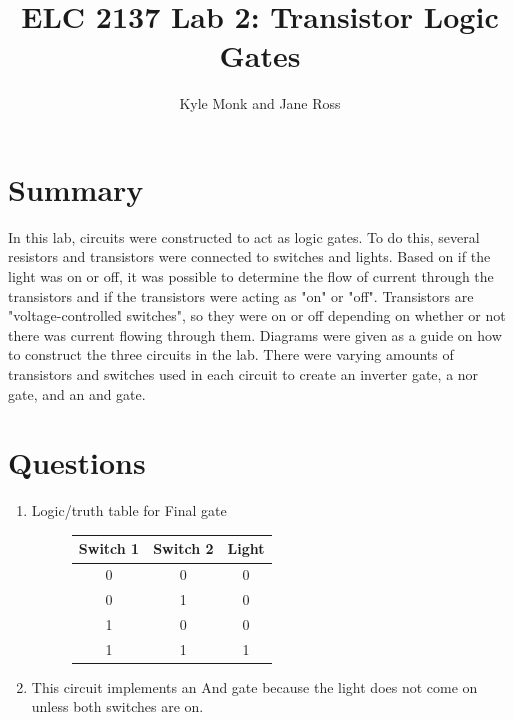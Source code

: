 \documentclass[11pt]{article}
\begin{document}
	
	\title{ELC 2137 Lab 2: Transistor Logic Gates}
	\author{Kyle Monk and Jane Ross}
	\maketitle
	
	
	\section*{Summary}
	
	In this lab, circuits were constructed to act as logic gates. To do this, several resistors and transistors were connected to switches and lights. Based on if the light was on or off, it was possible to determine the flow of current through the transistors and if the transistors were acting as "on" or "off". Transistors are "voltage-controlled switches", so they were on or off depending on whether or not there was current flowing through them. Diagrams were given as a guide on how to construct the three circuits in the lab. There were varying amounts of transistors and switches used in each circuit to create an inverter gate, a nor gate, and an and gate. 
	
	\section*{Questions}
	
	\begin{enumerate}
		\item Logic/truth table for Final gate
			\begin{figure}[ht]\centering
					\begin{tabular}{c|c|c}
						Switch 1 & Switch 2 & Light \\
						\midrule
						0 & 0 & 0 \\
						0 & 1 & 0 \\
						1 & 0 & 0 \\
						1 & 1 & 1 \\
						\bottomrule
					\end{tabular} 
				\end{figure}
		\item This circuit implements an And gate because the light does not come on unless both switches are on.
	\end{enumerate}
	
\end{document}
